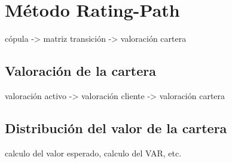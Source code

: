 \section{M\'etodo Rating-Path}
c\'opula -> matriz transici\'on -> valoraci\'on cartera


\subsection{Valoraci\'on de la cartera}
valoraci\'on activo -> valoraci\'on cliente -> valoraci\'on cartera

\subsection{Distribuci\'on del valor de la cartera}
calculo del valor esperado, calculo del VAR, etc.

